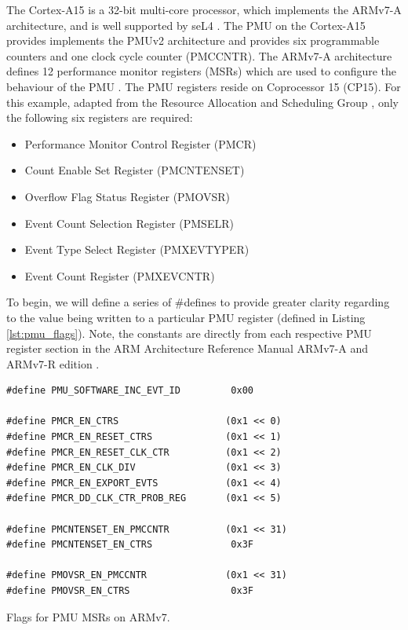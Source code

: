 {The Cortex-A15 is a 32-bit multi-core processor, which implements the ARMv7-A architecture, and is well supported by seL4 \cite{DocsSeL4Hardware}. The PMU on the Cortex-A15 provides implements the PMUv2 architecture and provides six programmable counters \cite{DocsArmCortexA15PMU} and one clock cycle counter (PMCCNTR). The ARMv7-A architecture defines 12 performance monitor registers (MSRs) which are used to configure the behaviour of the PMU \cite{DocsArmv7PMURegs}. The PMU registers reside on Coprocessor 15 (CP15). For this example, adapted from the Resource Allocation and Scheduling Group \cite{TutHowToUsePMU}, only the following six registers are required:

\ssp

\begin{itemize}
    \item Performance Monitor Control Register (PMCR)
    \item Count Enable Set Register (PMCNTENSET)
    \item Overflow Flag Status Register (PMOVSR)
    \item Event Count Selection Register (PMSELR)
    \item Event Type Select Register (PMXEVTYPER)
    \item Event Count Register (PMXEVCNTR)
\end{itemize}

\dsp

To begin, we will define a series of \#defines to provide greater clarity regarding to the value being written to a particular PMU register (defined in Listing \ref{lst:pmu_flags}). Note, the constants are directly from each respective PMU register section in the ARM Architecture Reference Manual ARMv7-A and ARMv7-R edition \cite{DocsArvm7}.

\begin{listing}
    \begin{verbatim}
#define PMU_SOFTWARE_INC_EVT_ID         0x00

#define PMCR_EN_CTRS                   (0x1 << 0)
#define PMCR_EN_RESET_CTRS             (0x1 << 1)
#define PMCR_EN_RESET_CLK_CTR          (0x1 << 2)
#define PMCR_EN_CLK_DIV                (0x1 << 3)
#define PMCR_EN_EXPORT_EVTS            (0x1 << 4)
#define PMCR_DD_CLK_CTR_PROB_REG       (0x1 << 5)

#define PMCNTENSET_EN_PMCCNTR          (0x1 << 31)
#define PMCNTENSET_EN_CTRS              0x3F

#define PMOVSR_EN_PMCCNTR              (0x1 << 31)
#define PMOVSR_EN_CTRS                  0x3F
    \end{verbatim}
    \caption{Flags for PMU MSRs on ARMv7.}
    \label{lst:pmu_flags}
\end{listing}

}
